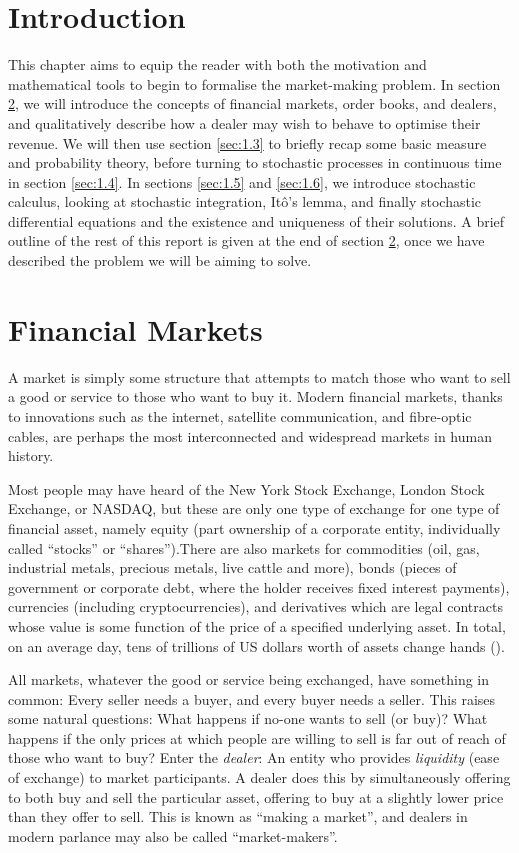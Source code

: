 \section{Introduction}
This chapter aims to equip the reader with both the motivation and mathematical 
tools to begin to formalise the market-making problem. In section \ref{sec:1.2},
we will introduce the concepts of financial markets, order books, and dealers, and 
qualitatively describe how a dealer may wish to behave to optimise their revenue. We
will then use section \ref{sec:1.3} to briefly recap some basic measure and probability 
theory, before turning to stochastic processes in continuous time in section 
\ref{sec:1.4}. In sections \ref{sec:1.5} and \ref{sec:1.6}, we introduce stochastic 
calculus, looking at stochastic integration, It\^{o}'s lemma, and finally stochastic 
differential equations and the existence and uniqueness of their solutions. A brief 
outline of the rest of this report is given at the end of section \ref{sec:1.2},
once we have described the problem we will be aiming to solve.

\section{Financial Markets}\label{sec:1.2}
A market is simply some structure that attempts to match those who want to 
sell a good or service to those who want to buy it. Modern financial markets, 
thanks to innovations such as the internet, satellite communication, and 
fibre-optic cables, are perhaps the most interconnected and widespread markets in 
human history. 

Most people may have heard of the New York Stock Exchange, London Stock Exchange, 
or NASDAQ, but these are only one type of exchange for one type of financial asset, 
namely equity (part ownership of a corporate entity, individually called ``stocks'' 
or ``shares'').There are also markets for commodities (oil, gas, industrial metals, 
precious metals, live cattle and more), bonds (pieces of government or corporate 
debt, where the holder receives fixed interest payments), currencies (including 
cryptocurrencies), and derivatives which are legal contracts whose value is some 
function of the price of a specified underlying asset. In total, on an average day, 
tens of trillions of US dollars worth of assets change hands (\cite{ADV}).

All markets, whatever the good or service being exchanged, have something in common: 
Every seller needs a buyer, and every buyer needs a seller. This raises some 
natural questions: What happens if no-one wants to sell (or buy)? What happens if 
the only prices at which people are willing to sell is far out of reach of those 
who want to buy? Enter the \textit{dealer}: An entity who provides \textit{liquidity} 
(ease of exchange) to market participants. A dealer does this by simultaneously 
offering to both buy and sell the particular asset, offering to buy at a slightly 
lower price than they offer to sell. This is known as ``making a market'', and dealers 
in modern parlance may also be called ``market-makers''.

